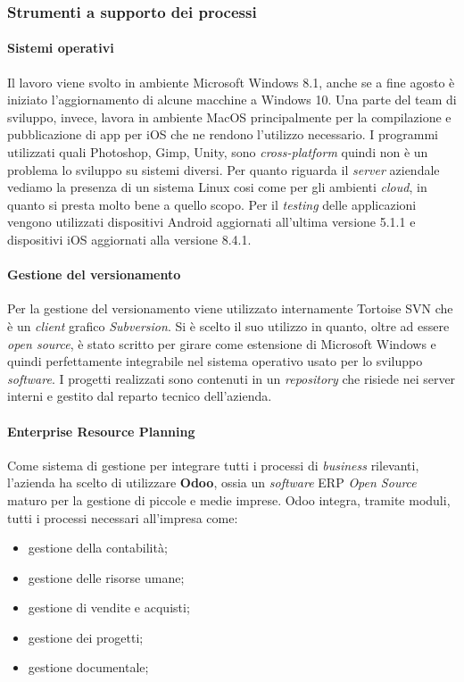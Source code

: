 \subsubsection{Strumenti a supporto dei processi}
\paragraph{Sistemi operativi}
Il lavoro viene svolto in ambiente Microsoft Windows 8.1, anche se a fine agosto \`e iniziato l'aggiornamento di alcune macchine a Windows 10. Una parte del team di sviluppo, invece, lavora in ambiente MacOS principalmente per la compilazione e pubblicazione di app per iOS che ne rendono l'utilizzo necessario. I programmi utilizzati quali Photoshop, Gimp, Unity, sono \textit{cross-platform\gloss} quindi non \`e un problema lo sviluppo su sistemi diversi. 
Per quanto riguarda il \textit{server} aziendale vediamo la presenza di un sistema Linux cosi come per gli ambienti \textit{cloud}, in quanto si presta molto bene a quello scopo.
Per il \textit{testing} delle applicazioni vengono utilizzati dispositivi Android aggiornati all'ultima versione 5.1.1 e dispositivi iOS aggiornati alla versione 8.4.1.

\paragraph{Gestione del versionamento}
Per la gestione del versionamento viene utilizzato internamente Tortoise SVN che \`e un \textit{client} grafico \textit{Subversion}. Si \`e scelto il suo utilizzo in quanto, oltre ad essere \textit{open source}, \`e stato scritto per girare come estensione di Microsoft Windows e quindi perfettamente integrabile nel sistema operativo usato per lo sviluppo \textit{software\gloss}.
I progetti realizzati sono contenuti in un \textit{repository} che risiede nei server interni e gestito dal reparto tecnico dell'azienda.

\paragraph{Enterprise Resource Planning}
Come sistema di gestione per integrare tutti i processi di \textit{business\gloss} rilevanti, l'azienda ha scelto di utilizzare \textbf{Odoo}, ossia un \textit{software\gloss} ERP \textit{Open Source} maturo per la gestione di piccole e medie imprese. 
Odoo integra, tramite moduli, tutti i processi necessari all'impresa come:
\begin{itemize}
	\item gestione della contabilità;
	\item gestione delle risorse umane;
	\item gestione di vendite e acquisti;
	\item gestione dei progetti;
	\item gestione documentale;
\end{itemize}


